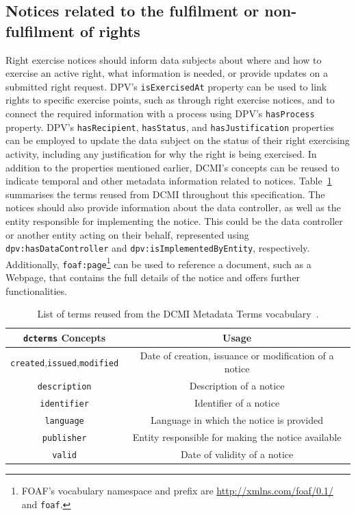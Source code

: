 \documentclass{IOS-Book-Article}     %
\begin{document}
\subsection{Notices related to the fulfilment or non-fulfilment of rights}
\label{sec:notices}

Right exercise notices should inform data subjects about where and how to exercise an active right, what information is needed, or provide updates on a submitted right request.
DPV’s \texttt{isExercisedAt} property can be used to link rights to specific exercise points, such as through right exercise notices, and to connect the required information with a process using DPV’s \texttt{hasProcess} property. DPV's \texttt{hasRecipient}, \texttt{hasStatus}, and \texttt{hasJustification} properties can be employed to update the data subject on the status of their right exercising activity, including any justification for why the right is being exercised.
In addition to the properties mentioned earlier, DCMI's concepts can be reused to indicate temporal and other metadata information related to notices.
Table~\ref{tab:dcterms} summarises the terms reused from DCMI throughout this specification.
The notices should also provide information about the data controller, as well as the entity responsible for implementing the notice.
This could be the data controller or another entity acting on their behalf, represented using \texttt{dpv:hasDataController} and \texttt{dpv:isImplementedByEntity}, respectively. Additionally, \texttt{foaf:page}\footnote{FOAF's vocabulary namespace and prefix are \url{http://xmlns.com/foaf/0.1/} and \texttt{foaf}.} can be used to reference a document, such as a Webpage, that contains the full details of the notice and offers further functionalities.

\begin{table}[ht]
    \centering\fontsize{7}{8}
    \begin{tabular}{c|c}
        \textbf{\texttt{dcterms} Concepts} & \textbf{Usage} \\ \hline\hline
        \texttt{created},\texttt{issued},\texttt{modified} & Date of creation, issuance or modification of a notice \\ \hline
        \texttt{description} & Description of a notice \\ \hline
        \texttt{identifier} & Identifier of a notice \\ \hline
        \texttt{language} & Language in which the notice is provided \\ \hline
        \texttt{publisher} & Entity responsible for making the notice available \\ \hline
        \texttt{valid} & Date of validity of a notice \\
    \end{tabular}
    \caption{List of terms reused from the DCMI Metadata Terms vocabulary~\cite{dcmi_2020}.}
    \label{tab:dcterms}
\end{table}
\end{document}
